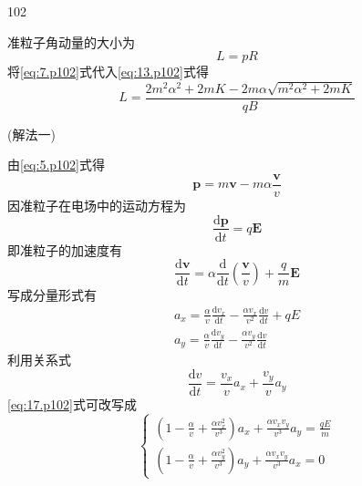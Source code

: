 \begin{solution}{102}
\begin{subsolution}
\begin{equation}
        \end{equation}
        准粒子角动量的大小为
        \begin{equation}
            L = p R
            \label{eq:13.p102}
        \end{equation}
        将\eqref{eq:7.p102}式代入\eqref{eq:13.p102}式得
        \begin{equation}
            L = \frac {2 m ^ {2} \alpha^ {2} + 2 m K - 2 m \alpha \sqrt {m ^ {2} \alpha^ {2} + 2 m K}}{q B}
            \label{eq:14.p102}
        \end{equation}
    \end{subsolution}
    \begin{subsolution}
        (解法一)

        由\eqref{eq:5.p102}式得
        \begin{equation}
            \boldsymbol {p} = m \boldsymbol {v} - m \alpha \frac {\boldsymbol {v}}{v}
            \label{eq:15.p102}
        \end{equation}
        因准粒子在电场中的运动方程为
        \begin{equation}
            \frac {\mathrm{d} \pmb {p}}{\mathrm{d} t} = q \pmb {E}
            \label{eq:16.p102}
        \end{equation}
        即准粒子的加速度有
        \begin{equation}
            {\frac {\mathrm{d} \boldsymbol {v}}{\mathrm{d} t}} = \alpha {\frac {\mathrm{d}}{\mathrm{d} t}} {\left({\frac {\boldsymbol {v}}{v}}\right)} + {\frac {q}{m}} \boldsymbol {E}
            \label{eq:17.p102}
        \end{equation}
        写成分量形式有
        \begin{align*}
            a _ {x} = \frac {\alpha}{v} \frac {\mathrm{d} v _ {x}}{\mathrm{d} t} - \frac {\alpha v _ {x}}{v ^ {2}} \frac {\mathrm{d} v}{\mathrm{d} t} + q E \\
            a _ {y} = \frac {\alpha}{v} \frac {\mathrm{d} v _ {y}}{\mathrm{d} t} - \frac {\alpha v _ {y}}{v ^ {2}} \frac {\mathrm{d} v}{\mathrm{d} t}
        \end{align*}
        利用关系式
        \begin{equation}
            \frac {\mathrm{d} v}{\mathrm{d} t} = \frac {v _ {x}}{v} a _ {x} + \frac {v _ {y}}{v} a _ {y}
            \label{eq:18.p102}
        \end{equation}
        \eqref{eq:17.p102}式可改写成
        \begin{equation}
            \left\{ \begin{array}{l} \left(1 - \frac {\alpha}{v} + \frac {\alpha v _ {x} ^ {2}}{v ^ {3}}\right) a _ {x} + \frac {\alpha v _ {x} v _ {y}}{v ^ {3}} a _ {y} = \frac {q E}{m} \\ \left(1 - \frac {\alpha}{v} + \frac {\alpha v _ {y} ^ {2}}{v ^ {3}}\right) a _ {y} + \frac {\alpha v _ {x} v _ {y}}{v ^ {3}} a _ {x} = 0 \end{array} \right.

\end{equation}
\end{subsolution}
\end{solution}
